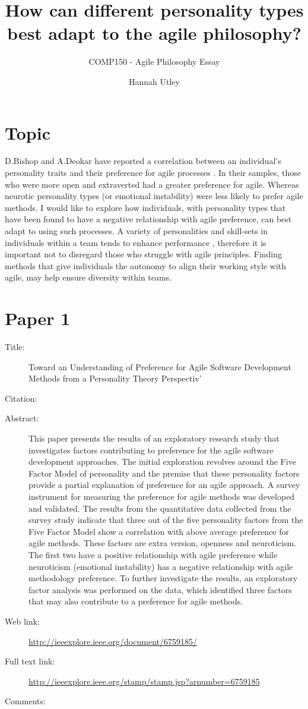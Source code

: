 \documentclass{scrartcl}
\title{How can different personality types best adapt to the agile philosophy?}
\subtitle{COMP150 - Agile Philosophy Essay}
\author{Hannah Utley}
\begin{document}
\maketitle

\section*{Topic}

D.Bishop and A.Deokar have reported a correlation between an individual’s personality traits and their preference for agile processes 
\cite{Paper1}. In their samples, those who were more open and extraverted had a greater preference for agile. Whereas neurotic 
personality types (or emotional instability) were less likely to prefer agile methods. I would like to explore how individuals, with 
personality types that have been found to have a negative relationship with agile preference, can best adapt to using such processes. A 
variety of personalities and skill-sets in individuals within a team tends to enhance performance \cite{Paper3}, therefore it is 
important not to disregard those who struggle with agile principles. Finding methods that give individuals the autonomy to align their 
working style with agile, may help ensure diversity within teams.

\section*{Paper 1}
\begin{description}
\item[Title:] Toward an Understanding of Preference for Agile Software Development Methods from a Personality Theory Perspectiv'
\item[Citation:] \cite{Paper1}
\item[Abstract:] This paper presents the results of an exploratory research study that investigates factors contributing to preference 
for the agile software development approaches. The initial exploration revolves around the Five Factor Model of personality and the 
premise that these personality factors provide a partial explanation of preference for an agile approach. A survey instrument for 
measuring the preference for agile methods was developed and validated. The results from the quantitative data collected from the survey 
study indicate that three out of the five personality factors from the Five Factor Model show a correlation with above average 
preference for agile methods. These factors are extra version, openness and neuroticism. The first two have a positive relationship with 
agile preference while neuroticism (emotional instability) has a negative relationship with agile methodology preference. To further 
investigate the results, an exploratory factor analysis was performed on the data, which identified three factors that may also 
contribute to a preference for agile methods.
\item[Web link:] \url{http://ieeexplore.ieee.org/document/6759185/}
\item[Full text link:] \url{http://ieeexplore.ieee.org/stamp/stamp.jsp?arnumber=6759185}
\item[Comments:] 
\end{description}
\end{document}
